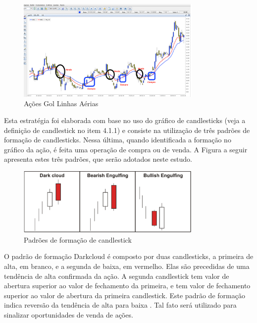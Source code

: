 \begin{figure}[h]
\centering
\label{f17}
\includegraphics[width=0.8\textwidth]{figuras/f17}
\caption{Ações Gol Linhas Aérias}
\end{figure}



Esta estratégia foi elaborada com base no uso do gráfico de candlesticks (veja a definição de candlestick no item 4.1.1) e consiste na utilização de três padrões de formação de candlesticks. Nessa última, quando identificada a formação no gráfico da ação, é feita uma operação de compra ou de venda. A Figura a seguir apresenta estes três padrões, que serão adotados neste estudo.

\begin{figure}[h]
\centering
\label{f18}
\includegraphics[width=0.8\textwidth]{figuras/f18}
\caption{Padrões de formação de candlestick}
\end{figure}


O padrão de formação Darkcloud é composto por duas candlesticks, a primeira de alta, em branco, e a segunda de baixa, em vermelho. Elas são precedidas de uma tendência de alta confirmada da ação. A segunda candlestick tem valor de abertura superior ao valor de fechamento da primeira, e tem valor de fechamento superior ao valor de abertura da primeira candlestick. Este padrão de formação indica reversão da tendência de alta para baixa \cite[p.61]{matsura2006}. Tal fato será utilizado para sinalizar oportunidades de venda de ações.

